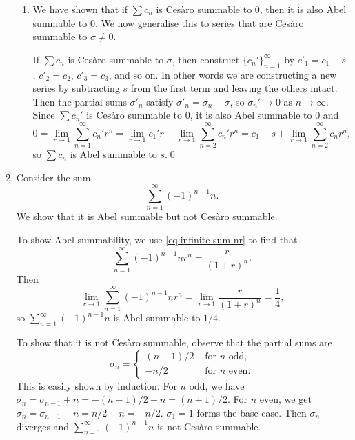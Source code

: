 \documentclass[oneside]{article}
\begin{document}
\begin{enumerate}[label=(\alph*)]
\begin{enumerate}[label=\textbf{\arabic*.}]
        \item We have shown that if $\sum c_n$ is Cesàro summable to $0$, then
        it is also Abel summable to $0$. We now generalise this to series that
        are Cesàro summable to $\sigma \neq 0$.

        If $\sum c_n$ is Cesàro summable to $\sigma$, then construct
        $\{c_n'\}_{n=1}^\infty$ by $c'_1 = c_1-s$, $c'_2 = c_2$, $c'_3 = c_3$,
        and so on. In other words we are constructing a new series by
        subtracting $s$ from the first term and leaving the others intact. Then
        the partial sums $\sigma'_n$ satisfy $\sigma'_n = \sigma_n - \sigma$, so
        $\sigma_n' \to 0$ as $n \to \infty$. Since $\sum c_n'$ is Cesàro
        summable to $0$, it is also Abel summable to $0$ and \[
          0 = \lim_{r\to1}\sum_{n=1}^\infty c_n'r^n
          = \lim_{r\to1}c_1'r + \lim_{r\to1}\sum_{n=2}^\infty c_n'r^n
          = c_1 -s + \lim_{r\to1}\sum_{n=2}^\infty c_nr^n \text{,}
        \] so $\sum c_n$ is Abel summable to $s$.\qed
    \end{enumerate}

  \item Consider the sum \[
    \sum_{n=1}^\infty (-1)^{n-1}n \text{.}
  \] We show that it is Abel summable but not Cesàro summable.

  To show Abel summability, we use \eqref{eq:infinite-sum-nr} to find that\[
    \sum_{n=1}^\infty (-1)^{n-1}nr^n = \frac{r}{(1+r)^n} \text{.}
  \] Then\[
    \lim_{r\to1}\sum_{n=1}^\infty (-1)^{n-1}nr^n
    = \lim_{r\to1}\frac{r}{(1+r)^n}
    = \frac{1}{4} \text{,}
  \] so $\sum_{n=1}^\infty (-1)^{n-1}n$ is Abel summable to $1/4$.

  To show that it is not Cesàro summable, observe that the partial sums are
  \[
    \sigma_n = \begin{cases}
      (n + 1) / 2 & \text{ for $n$ odd,} \\
      -n / 2 & \text{ for $n$ even.}
    \end{cases}
  \] This is easily shown by induction. For $n$ odd, we have
  $\sigma_n = \sigma_{n-1} + n = -(n - 1) / 2 + n = (n+1)/2$. For $n$ even, we
  get $\sigma_n = \sigma_{n-1} - n = n/2 - n = -n / 2$. $\sigma_1 = 1$
  forms the base case. Then $\sigma_n$ diverges and
  $\sum_{n=1}^\infty (-1)^{n-1}n$ is not Cesàro summable.

  \end{enumerate}
\end{document}

